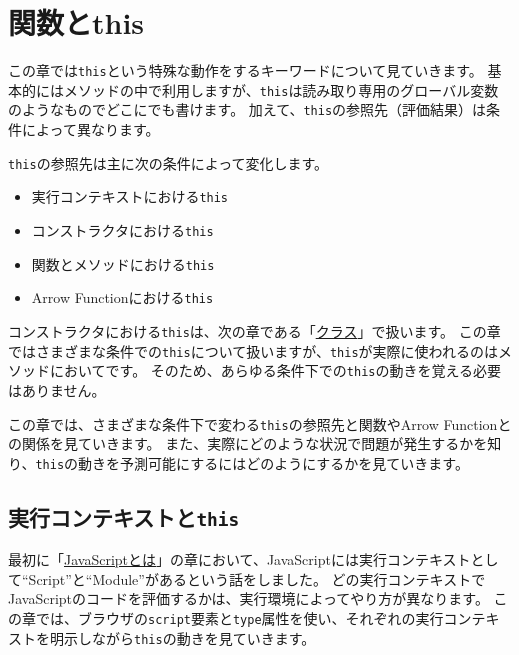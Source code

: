 \hypertarget{function-this}{%
\chapter{関数とthis}\label{function-this}}
\thispagestyle{frontheadings}

この章では\texttt{this}という特殊な動作をするキーワードについて見ていきます。
基本的にはメソッドの中で利用しますが、\texttt{this}は読み取り専用のグローバル変数のようなものでどこにでも書けます。
加えて、\texttt{this}の参照先（評価結果）は条件によって異なります。

\texttt{this}の参照先は主に次の条件によって変化します。

\begin{itemize}
\item
  実行コンテキストにおける\texttt{this}
\item
  コンストラクタにおける\texttt{this}
\item
  関数とメソッドにおける\texttt{this}
\item
  Arrow Functionにおける\texttt{this}
\end{itemize}

コンストラクタにおける\texttt{this}は、次の章である「\hyperlink{class}{クラス}」で扱います。
この章ではさまざまな条件での\texttt{this}について扱いますが、\texttt{this}が実際に使われるのはメソッドにおいてです。
そのため、あらゆる条件下での\texttt{this}の動きを覚える必要はありません。

この章では、さまざまな条件下で変わる\texttt{this}の参照先と関数やArrow
Functionとの関係を見ていきます。
また、実際にどのような状況で問題が発生するかを知り、\texttt{this}の動きを予測可能にするにはどのようにするかを見ていきます。

\hypertarget{execution-context-this}{%
\section{\texorpdfstring{実行コンテキストと\texttt{this}}{実行コンテキストとthis}}\label{execution-context-this}}

最初に「\hyperlink{what-is-javascript}{JavaScriptとは}」の章において、JavaScriptには実行コンテキストとして``Script''と``Module''があるという話をしました。
どの実行コンテキストでJavaScriptのコードを評価するかは、実行環境によってやり方が異なります。
この章では、ブラウザの\texttt{script}要素と\texttt{type}属性を使い、それぞれの実行コンテキストを明示しながら\texttt{this}の動きを見ていきます。

